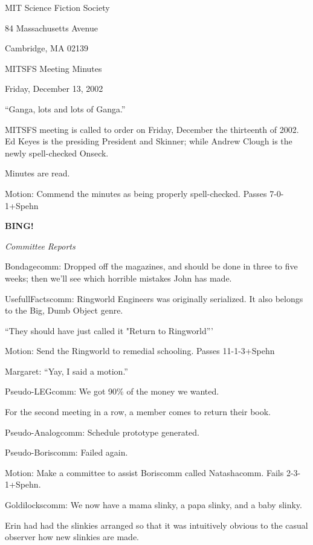 \documentclass[12pt]{article}
\newcommand{\bing}{{\bf BING!} }
\newcommand{\goto}[1]{\bing \vskip 12pt \centerline{{\em{#1}}}}
\begin{document}
\begin{center}

MIT Science Fiction Society 

84 Massachusetts Avenue

Cambridge, MA 02139

\vspace{12pt}

MITSFS Meeting Minutes 

Friday, December 13, 2002

\end{center}

\vspace{18pt}

\setlength{\parskip}{6pt}

``Ganga, lots and lots of Ganga.''

MITSFS meeting is called to order on Friday, December the thirteenth of 2002.  Ed Keyes is the presiding President and Skinner; while Andrew Clough is the newly spell-checked Onseck.

Minutes are read.

Motion:  Commend the minutes as being properly spell-checked.  Passes 7-0-1+Spehn

\goto{Committee Reports}

Bondagecomm:  Dropped off the magazines, and should be done in three to five weeks; then we'll see which horrible mistakes John has made.

UsefullFactscomm:  Ringworld Engineers was originally serialized.  It also belongs to the Big, Dumb Object genre.

``They should have just called it "Return to Ringworld'''

Motion:  Send the Ringworld to remedial schooling.  Passes 11-1-3+Spehn

Margaret:  ``Yay, I said a motion.''

Pseudo-LEGcomm: We got 90\% of the money we wanted.

For the second meeting in a row, a member comes to return their book.

Pseudo-Analogcomm:  Schedule prototype generated.

Pseudo-Boriscomm:  Failed again.

Motion:  Make a committee to assist Boriscomm called Natashacomm.  Fails 2-3-1+Spehn.

Goldilockscomm:  We now have a mama slinky, a papa slinky, and a baby slinky.

Erin had had the slinkies arranged so that it was intuitively obvious to the casual observer how new slinkies are made.
\end{document}
